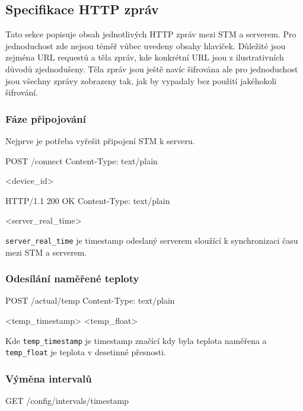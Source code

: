 \subsection{Specifikace HTTP zpráv}

Tato sekce popisuje obsah jednotlivých HTTP zpráv mezi STM a serverem.
Pro jednoduchost zde nejsou téměř vůbec uvedeny obsahy hlaviček.
Důležité jsou zejména URL requestů a těla zpráv, kde konkrétní URL jsou z ilustrativních důvodů
zjednodušeny.
Těla zpráv jsou ještě navíc šifrována ale pro jednoduchost jsou všechny zprávy zobrazeny tak,
jak by vypadaly bez použití jakéhokoli šifrování.

\subsubsection{Fáze připojování}
Nejprve je potřeba vyřešit připojení STM k serveru.

\begin{packetstm}
POST /connect
Content-Type: text/plain

<device_id>
\end{packetstm}

\begin{packetserver}
HTTP/1.1 200 OK
Content-Type: text/plain

<server_real_time>
\end{packetserver}

\texttt{server\_real\_time} je timestamp odeslaný serverem sloužící k synchronizaci času
mezi STM a serverem.

\subsubsection{Odesílání naměřené teploty}
\begin{packetstm}
POST /actual/temp
Content-Type: text/plain

<temp_timestamp>
<temp_float>
\end{packetstm}

Kde \texttt{temp\_timestamp} je timestamp značící kdy byla teplota naměřena a
\texttt{temp\_float} je teplota v desetinné přesnosti.

\subsubsection{Výměna intervalů}
\begin{packetstm}
GET /config/intervals/timestamp
\end{packetstm}

